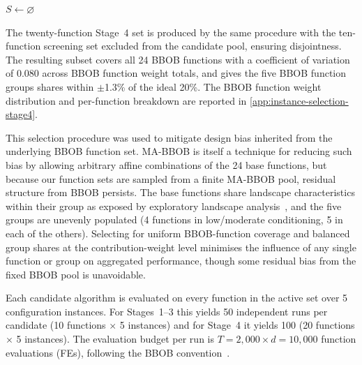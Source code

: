 \begin{algorithm}[t]
\caption{Greedy MA-BBOB function selection. At each step the candidate whose addition most reduces missing BBOB function count, group imbalance, and per-BBOB-function weight variability is selected.}
\label{alg:instance-selection}
$S \gets \varnothing$\;
\end{algorithm}

The twenty-function Stage~4 set is produced by the same procedure with the ten-function screening set excluded from the candidate pool, ensuring disjointness. The resulting subset covers all 24 BBOB functions with a coefficient of variation of $0.080$ across BBOB function weight totals, and gives the five BBOB function groups shares within $\pm$1.3\% of the ideal 20\%. The BBOB function weight distribution and per-function breakdown are reported in \cref{app:instance-selection-stage4}.

This selection procedure was used to mitigate design bias inherited from the underlying BBOB function set. MA-BBOB is itself a technique for reducing such bias by allowing arbitrary affine combinations of the 24 base functions, but because our function sets are sampled from a finite MA-BBOB pool, residual structure from BBOB persists. The base functions share landscape characteristics within their group as exposed by exploratory landscape analysis~\cite{long2023bbobinstance}, and the five groups are unevenly populated (4 functions in low/moderate conditioning, 5 in each of the others). Selecting for uniform BBOB-function coverage and balanced group shares at the contribution-weight level minimises the influence of any single function or group on aggregated performance, though some residual bias from the fixed BBOB pool is unavoidable.

Each candidate algorithm is evaluated on every function in the active set over 5 configuration instances. For Stages~1--3 this yields 50 independent runs per candidate (10 functions $\times$ 5 instances) and for Stage~4 it yields 100 (20 functions $\times$ 5 instances). The evaluation budget per run is $T = 2{,}000 \times d = 10{,}000$ function evaluations (FEs), following the BBOB convention~\cite{hansen2021coco}.

